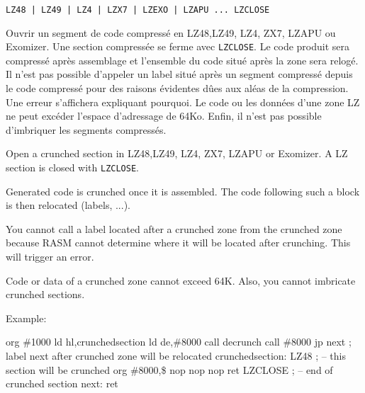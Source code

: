 \subsubsection{}
\begin{verbatim}
LZ48 | LZ49 | LZ4 | LZX7 | LZEXO | LZAPU ... LZCLOSE
\end{verbatim}

\begin{xfr}
Ouvrir un segment de code compressé en LZ48,LZ49, LZ4, ZX7, LZAPU ou Exomizer. Une section compressée se ferme avec \texttt{LZCLOSE}.
Le code produit sera compressé après assemblage et l'ensemble du code situé après la zone sera relogé.
Il n'est pas possible d'appeler un label situé après un segment compressé depuis le code compressé pour des raisons évidentes dûes aux aléas de la compression. Une erreur s'affichera expliquant pourquoi.
Le code ou les données d'une zone LZ ne peut excéder l'espace d'adressage de 64Ko. Enfin, il n'est pas possible d'imbriquer les segments compressés.
\end{xfr}

\begin{xen}
Open a crunched section in LZ48,LZ49, LZ4, ZX7, LZAPU or Exomizer. A LZ section is closed with \texttt{LZCLOSE}.

Generated code is crunched once it is assembled. The code following such a block is then relocated (labels, ...).


You cannot call a label located after a crunched zone from the crunched zone because RASM cannot determine where it will be located after crunching. This will trigger an error.

Code or data of a crunched zone cannot exceed 64K.  Also, you cannot imbricate crunched sections.

Example:
\end{xen}


\begin{code}
  org \#1000
  ld hl,crunchedsection
  ld de,\#8000
  call decrunch
  call \#8000
  jp next         ; label next after crunched zone will be relocated
\medskip
  crunchedsection:
  LZ48            ; -- this section will be crunched
    org \#8000,\$
    nop
    nop
    nop
    ret
  LZCLOSE   ; -- end of crunched section
\medskip
  next:
    ret
\end{code}


\subsubsection{}

